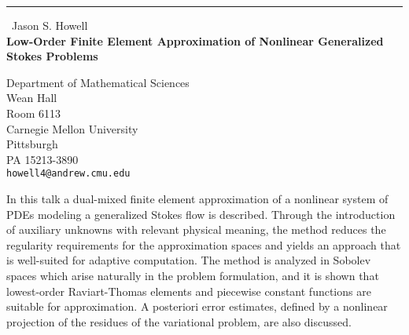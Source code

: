 \documentclass{report}
\begin{document}
\begin{center}
\rule{6in}{1pt} \
{\large Jason S. Howell \\
{\bf Low-Order Finite Element Approximation of Nonlinear Generalized Stokes Problems}}

Department of Mathematical Sciences \\ Wean Hall \\ Room 6113 \\ Carnegie Mellon University \\ Pittsburgh \\ PA 15213-3890
\\
{\tt howell4@andrew.cmu.edu}\end{center}

In this talk a dual-mixed finite element approximation of a nonlinear
system of PDEs modeling a generalized Stokes flow is described. Through
the introduction of auxiliary unknowns with relevant physical meaning,
the method reduces the regularity requirements for the approximation
spaces and yields an approach that is well-suited for adaptive
computation. The method is analyzed in Sobolev spaces which arise
naturally in the problem formulation, and it is shown that lowest-order
Raviart-Thomas elements and piecewise constant functions are suitable for
approximation. A posteriori error estimates, defined by a nonlinear
projection of the residues of the variational problem, are also
discussed.
\end{document}
